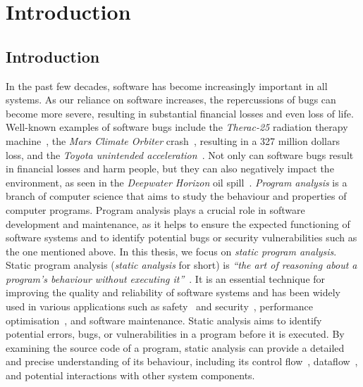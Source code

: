 \chapter{Introduction}
\section{Introduction}
In the past few decades, software has become increasingly important in all systems.
As our reliance on software increases, the repercussions of bugs can become more severe,
resulting in substantial financial losses and even loss of life.
Well-known examples of software bugs include the \emph{Therac-25} radiation therapy machine~\cite{leveson1993investigation},
the \emph{Mars Climate Orbiter} crash~\cite{Sawyer1999}, resulting in a 327 million dollars loss, and the \emph{Toyota unintended acceleration}~\cite{kane2010toyota}.
Not only can software bugs result in ﬁnancial losses and harm people, but they can also negatively impact the environment,
as seen in the \emph{Deepwater Horizon} oil spill~\cite{Shafer2010Oil}.
\emph{Program analysis} is a branch of computer science that aims to study the behaviour
and properties of computer programs. Program analysis plays a crucial role in software
development and maintenance, as it helps to ensure the expected functioning of software
systems and to identify potential bugs or security vulnerabilities such as the one mentioned above.
In this thesis, we focus on \emph{static program analysis}. 
Static program analysis (\emph{static analysis} for short) is
\emph{``the art of reasoning about a program's behaviour without executing it''}~\cite{spa}.
It is an essential technique for improving the quality and reliability of software
systems and has been widely used in various applications such
as safety~\cite{cousot2005astree,Blanchet2002} and security~\cite{piskachev2021secucheck,flowDroid,ayewah2008using,Sayar_2022,fink2012wala},
performance optimisation~\cite{aho2007compilers,appel2004modern}, and software maintenance.
Static analysis aims to identify potential errors, bugs, or vulnerabilities
in a program before it is executed.
By examining the source code of a program, static
analysis can provide a detailed and precise understanding of its behaviour, including
its control flow~\cite{allen1970control}, dataflow~\cite{kam1977monotone},
and potential interactions with other system components.



